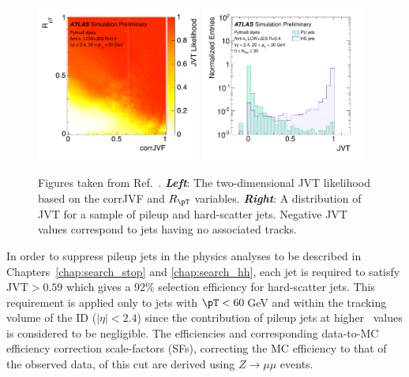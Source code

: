 \begin{figure}[!htb]
    \begin{center}
        \includegraphics[width=0.48\textwidth]{figures/chapter3/jets/jvt_2d}
        \includegraphics[width=0.48\textwidth]{figures/chapter3/jets/jvt_disc}
        \caption{
            Figures taken from Ref.~\cite{JVT}.
            \textit{\textbf{Left}}: The two-dimensional JVT likelihood based on the corrJVF and $R_{\pT}$ variables.
            \textit{\textbf{Right}}: A distribution of JVT for a sample of pileup and hard-scatter jets. Negative JVT values
                correspond to jets having no associated tracks.
        }
        \label{fig:jvt_disc}
    \end{center}
\end{figure}

In order to suppress pileup jets in the physics analyses to be described in Chapters~\ref{chap:search_stop} and \ref{chap:search_hh},
each jet is required to satisfy $\text{JVT} > 0.59$ which gives a 92\% selection efficiency for hard-scatter jets.
This requirement is applied only to jets with $\pT<60$\,GeV and within the tracking volume of the ID ($| \eta | < 2.4$)
since the contribution of pileup jets at higher \pT~values is considered to be negligible.
The efficiencies and corresponding data-to-MC efficiency correction scale-factors (SFs), correcting the MC efficiency
to that of the observed data, of this cut are derived using $Z \rightarrow \mu \mu$ events.
